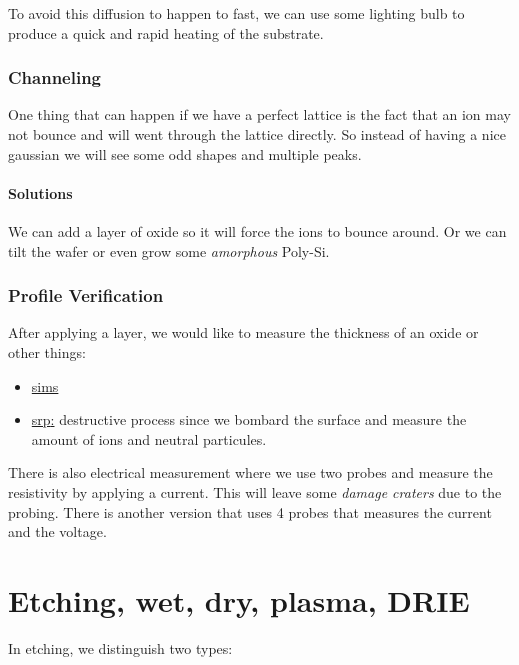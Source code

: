\documentclass[
]{article}
\begin{document}
To avoid this diffusion to happen to fast, we can use some lighting bulb
to produce a quick and rapid heating of the substrate.

\hypertarget{channeling}{%
\subsubsection{Channeling}\label{channeling}}

One thing that can happen if we have a perfect lattice is the fact that
an ion may not bounce and will went through the lattice directly. So
instead of having a nice gaussian we will see some odd shapes and
multiple peaks.

\hypertarget{solutions}{%
\paragraph{Solutions}\label{solutions}}

We can add a layer of oxide so it will force the ions to bounce around.
Or we can tilt the wafer or even grow some \emph{amorphous} Poly-Si.

\hypertarget{profile-verification}{%
\subsubsection{Profile Verification}\label{profile-verification}}

After applying a layer, we would like to measure the thickness of an
oxide or other things:

\begin{itemize}
\item
  \ul{{sims}}
\item
  \ul{{srp}:} destructive process since we bombard the surface and
  measure the amount of ions and neutral particules.
\end{itemize}

There is also electrical measurement where we use two probes and measure
the resistivity by applying a current. This will leave some \emph{damage
craters} due to the probing. There is another version that uses 4 probes
that measures the current and the voltage.

\hypertarget{etching-wet-dry-plasma-drie}{%
\section{Etching, wet, dry, plasma,
DRIE}\label{etching-wet-dry-plasma-drie}}

In etching, we distinguish two types:
\end{document}
